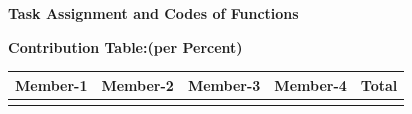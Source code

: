 \documentclass{article}
\begin{document}
\begin{center}
  \begin{code}
\textbf{Task Assignment and Codes of Functions}

\end{code}  
\end{center}
\textbf{Contribution Table:(per Percent) }
\begin{center}
\begin{tabular}{c|c|c|c|c}
    \hline
   \textbf{Member-1 }  & \textbf{Member-2 } & \textbf{Member-3}& \textbf{Member-4}& \textbf{Total}\\
    \hline
    \begin{center}
        \color{blue}{25}
    \end{center}
     & \begin{center}
        \color{blue}{25}
    \end{center}
     & \begin{center}
        \color{blue}{25}
    \end{center}
     & \begin{center}
        \color{blue}{25}
    \end{center}
     & \begin{center}
        \color{blue}{100}
    \end{center}
    
    
    
    
\end{tabular}
\\
\end{center}
\end{document}
